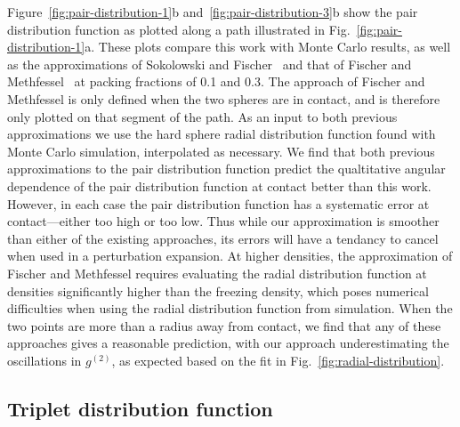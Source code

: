 \documentclass[letterpaper,twocolumn,amsmath,amssymb,pre,aps,10pt]{revtex4-1}
\begin{document}
Figure~\ref{fig:pair-distribution-1}b
and~\ref{fig:pair-distribution-3}b show the pair distribution function
as plotted along a path illustrated in
Fig.~\ref{fig:pair-distribution-1}a.  These plots compare this work
with Monte Carlo results, as well as the approximations of Sokolowski
and Fischer~\cite{sokolowski1992role} and that of Fischer and
Methfessel~\cite{fischer1980born} at packing fractions of 0.1 and 0.3.
The approach of Fischer and Methfessel is only defined when the two
spheres are in contact, and is therefore only plotted on that segment
of the path.  As an input to both previous approximations we use the
hard sphere radial distribution function found with Monte Carlo
simulation, interpolated as necessary.  We find that both previous
approximations to the pair distribution function predict the
qualtitative angular dependence of the pair distribution function at
contact better than this work.  However, in each case the pair
distribution function has a systematic error at contact---either too
high or too low.  Thus while our approximation is smoother than either
of the existing approaches, its errors will have a tendancy to cancel
when used in a perturbation expansion.  At higher densities, the
approximation of Fischer and Methfessel requires evaluating the radial
distribution function at densities significantly higher than the
freezing density, which poses numerical difficulties when using the
radial distribution function from simulation.  When the two points are
more than a radius away from contact, we find that any of these
approaches gives a reasonable prediction, with our approach
underestimating the oscillations in $g^{(2)}$, as expected based on the
fit in Fig.~\ref{fig:radial-distribution}.

\subsection{Triplet distribution function}
\end{document}
